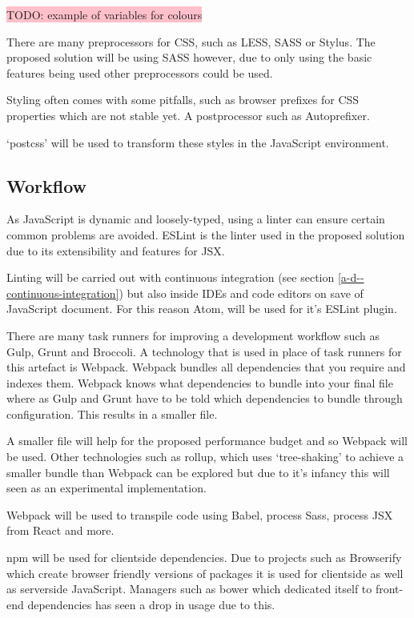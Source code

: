 \colorbox{pink}{TODO: example of variables for colours}

There are many preprocessors for CSS, such as LESS, SASS or Stylus. The proposed solution will be using SASS however, due to only using the basic features being used other preprocessors could be used. \cite{SASS}

Styling often comes with some pitfalls, such as browser prefixes for CSS properties which are not stable yet. A postprocessor such as Autoprefixer. \cite{autoprefixer}

`postcss' will be used to transform these styles in the JavaScript environment. \cite{postcss}

\subsection{Workflow} \label{a-d--workflow}

As JavaScript is dynamic and loosely-typed, using a linter can ensure certain common problems are avoided. ESLint is the linter used in the proposed solution due to its extensibility and features for JSX. \cite{eslint}

Linting will be carried out with continuous integration (see section \ref{a-d--continuous-integration}) but also inside IDEs and code editors on save of JavaScript document. For this reason Atom, will be used for it's ESLint plugin.

There are many task runners for improving a development workflow such as Gulp, Grunt and Broccoli. A technology that is used in place of task runners for this artefact is Webpack. Webpack bundles all dependencies that you require and indexes them. Webpack knows what dependencies to bundle into your final file where as Gulp and Grunt have to be told which dependencies to bundle through configuration. This results in a smaller file. \cite{webpack}

A smaller file will help for the proposed performance budget and so Webpack will be used. Other technologies such as rollup, which uses `tree-shaking' to achieve a smaller bundle than Webpack can be explored but due to it's infancy this will seen as an experimental implementation. \cite{rollup}

Webpack will be used to transpile code using Babel, process Sass, process JSX from React and more.

npm will be used for clientside dependencies. Due to projects such as Browserify which create browser friendly versions of packages it is used for clientside as well as serverside JavaScript. \cite{browserify} Managers such as bower which dedicated itself to front-end dependencies has seen a drop in usage due to this. \cite{bower}

